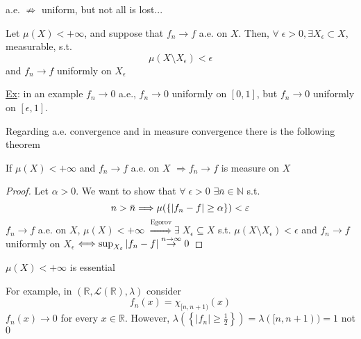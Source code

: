 a.e. \(\not\Longrightarrow\) uniform, but not all is lost...
\begin{theorem}[Egorov]
    Let \(\mu(X) < +\infty\), and suppose that \(f_n \to f\) a.e. on \(X\). Then, \(\forall \; \epsilon > 0, \exists X_{\epsilon} \subset X\), measurable, s.t. 
    \[
        \mu(X \setminus X_{\epsilon}) < \epsilon
    \]
    and \(f_n \to f\) uniformly on \(X_{\epsilon}\)
\end{theorem}
\underline{Ex}: in an example \(f_n \to 0\) a.e., \(f_n \to 0\) uniformly on \([0,1]\), but \(f_n \to 0\) uniformly on \([\epsilon, 1]\).

Regarding a.e. convergence and in measure convergence there is the following theorem
\begin{theorem}
    If \(\mu(X) < +\infty\) and \(f_n \to f\) a.e. on \(X\) \(\Longrightarrow f_n \to f\) is measure on \(X\)
\end{theorem}
\begin{proof}
    Let \(\alpha > 0\). We want to show that \(\forall \; \epsilon > 0\) \(\exists \bar{n} \in \mathbb{N}\) s.t. 
    \[
        n > \bar{n} \Longrightarrow \mu(\left\lbrace \abs{f_n -f} \geq \alpha\right\rbrace) <\varepsilon
    \]
    \(f_n \to f\) a.e. on \(X\), \(\mu(X) < +\infty\) \(\overset{\text{Egorov}}{\Longrightarrow} \exists \; X_{\epsilon} \subseteq X\) s.t. \(\mu(X \setminus X_{\epsilon}) < \epsilon\) and \(f_n \to f\) uniformly on \(X_{\epsilon}\) \(\Longleftrightarrow \sup_{X_{\varepsilon}} \abs{f_n - f} \overset{n\to \infty}{\to} 0\)
\end{proof}
\begin{remark}
    \(\mu(X) < +\infty\) is essential
\end{remark}
For example, in \((\mathbb{R}, \mathcal{L}(\mathbb{R}), \lambda)\) consider
\[
    f_n (x) = \chi_{[n, n+1)}(x)
\]
\(f_n(x) \to 0\) for every \(x \in \mathbb{R}\). However, \(\lambda(\left\lbrace \vert f_n \vert \geq \frac{1}{2}\right\rbrace) = \lambda([n, n+1)) = 1\) not \(0\)
